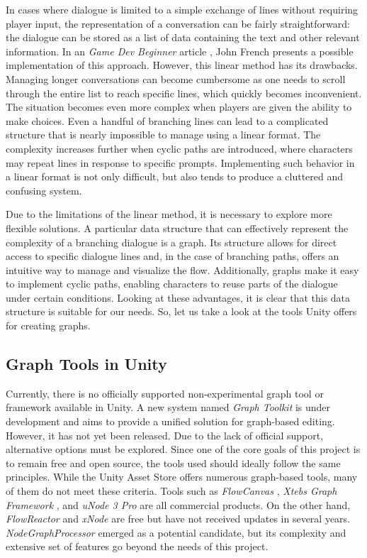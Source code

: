 In cases where dialogue is limited to a simple exchange of lines without requiring player input, the representation of a conversation can be fairly straightforward: the dialogue can be stored as a list of data containing the text and other relevant information. In an \textit{Game Dev Beginner} article \cite{Dialogue-French}, John French presents a possible implementation of this approach.  However, this linear method has its drawbacks. Managing longer conversations can become cumbersome as one needs to scroll through the entire list to reach specific lines, which quickly becomes inconvenient. The situation becomes even more complex when players are given the ability to make choices. Even a handful of branching lines can lead to a complicated structure that is nearly impossible to manage using a linear format. The complexity increases further when cyclic paths are introduced, where characters may repeat lines in response to specific prompts. Implementing such behavior in a linear format is not only difficult, but also tends to produce a cluttered and confusing system. 

Due to the limitations of the linear method, it is necessary to explore more flexible solutions. A particular data structure that can effectively represent the complexity of a branching dialogue is a graph. Its structure allows for direct access to specific dialogue lines and, in the case of branching paths, offers an intuitive way to manage and visualize the flow. Additionally, graphs make it easy to implement cyclic paths, enabling characters to reuse parts of the dialogue under certain conditions. Looking at these advantages, it is clear that this data structure is suitable for our needs. So, let us take a look at the tools Unity offers for creating graphs.

\subsection{Graph Tools in Unity}
Currently, there is no officially supported non-experimental graph tool or framework available in Unity. A new system named \textit{Graph Toolkit}  \cite{Unity-GraphToolkit} is under development and aims to provide a unified solution for graph-based editing. However, it has not yet been released. Due to the lack of official support, alternative options must be explored. Since one of the core goals of this project is to remain free and open source, the tools used should ideally follow the same principles. While the Unity Asset Store offers numerous graph-based tools, many of them do not meet these criteria. Tools such as \textit{FlowCanvas} \cite{FlowCanvas}, \textit{Xtebs Graph Framework} \cite{XtebsGraphFramework}, and \textit{uNode 3 Pro} \cite{uNode3Pro} are all commercial products. On the other hand, \textit{FlowReactor} \cite{FlowReactor} and \textit{xNode} \cite{xNode} are free but have not received updates in several years. \textit{NodeGraphProcessor} \cite{NodeGraphProcessor} emerged as a potential candidate, but its complexity and extensive set of features go beyond the needs of this project.

